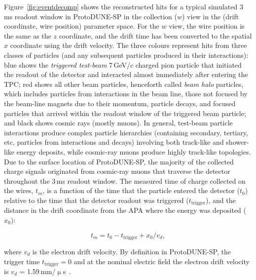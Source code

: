\documentclass[epjc3]{svjour3}
\begin{document}
Figure~\ref{fig:eventdecomp} shows the reconstructed hits for a typical simulated 3\,ms readout window in ProtoDUNE-SP in the collection ($w$) view in the (drift coordinate, wire position) parameter space. For the $w$ view, the wire position is the same as the $z$ coordinate, and the drift time has been converted to the spatial $x$ coordinate using the drift velocity. The three colours represent hits from three classes of particles (and any subsequent particles produced in their interactions): blue shows the \textit{triggered test-beam} 7\,GeV/$c$ charged pion particle that initiated the readout of the detector and interacted almost immediately after entering the TPC; red shows all other beam particles, henceforth called \textit{beam halo} particles, which includes particles from interactions in the beam line, those not focused by the beam-line magnets due to their momentum, particle decays, and focused particles that arrived within the readout window of the triggered beam particle; and black shows cosmic rays (mostly muons). In general, test-beam particle interactions produce complex particle hierarchies (containing secondary, tertiary, etc, particles from interactions and decays) involving both track-like and shower-like energy deposits, while cosmic-ray muons produce highly track-like topologies. Due to the surface location of ProtoDUNE-SP, the majority of the collected charge signals originated from cosmic-ray muons that traverse the detector throughout the 3\,ms readout window. The measured time of charge collected on the wires, $t_m$, is a function of the time that the particle entered the detector ($t_0$) relative to the time that the detector readout was triggered ($t_\textrm{trigger}$), and the distance in the drift coordinate from the APA where the energy was deposited ($x_0$):
\begin{linenomath*}
\begin{equation}
\label{eq:ambiguity}
    t_m = t_0 - t_\textrm{trigger} + x_0/v_d,
\end{equation}
\end{linenomath*}
where $v_d$ is the electron drift velocity. By definition in ProtoDUNE-SP, the trigger time $t_\textrm{trigger} = 0$ and at the nominal electric field the electron drift velocity is $v_d$ = 1.59\,mm/$\upmu$s~\cite{proto_performance}.
\end{document}
